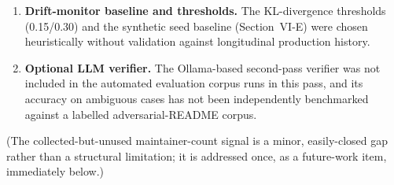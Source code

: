 \documentclass[journal]{IEEEtran}
\begin{document}
\begin{enumerate}
that npm's security team has taken down, the artifact's raw tarball bytes---not merely its listing in the
registry's version metadata---are permanently deleted from npm's CDN (Section~\ref{sec:new-incidents}). This
is narrower than a general claim that ``purged packages cannot be diffed'': the version-resolution fixes in
Section~V-C mean a resolvable predecessor \emph{can} now be located even past a purge, and the diff runs
correctly whenever both endpoints' tarballs still exist. The limitation is specific to versions whose content
has been deleted at the CDN level, which is npm's standard, permanent takedown behavior for confirmed-
malicious releases; detection for such versions instead relies on the coarser
\texttt{requested\_version\_unresolved} signal (Section~V-D), not a working capability diff of the actual
malicious payload.
\item \textbf{Drift-monitor baseline and thresholds.} The KL-divergence thresholds (0.15/0.30) and the
synthetic seed baseline (Section~VI-E) were chosen heuristically without validation against longitudinal
production history.
\item \textbf{Optional LLM verifier.} The Ollama-based second-pass verifier was not included in the automated
evaluation corpus runs in this pass, and its accuracy on ambiguous cases has not been independently
benchmarked against a labelled adversarial-README corpus.
\end{enumerate}

(The collected-but-unused maintainer-count signal is a minor, easily-closed gap rather than a structural
limitation; it is addressed once, as a future-work item, immediately below.)
\end{document}
